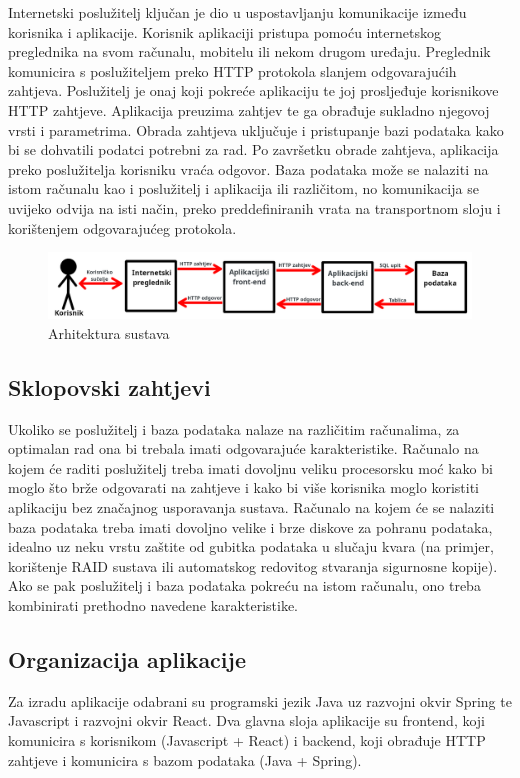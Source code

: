 				Internetski poslužitelj ključan je dio u uspostavljanju komunikacije između korisnika i aplikacije. Korisnik aplikaciji pristupa pomoću internetskog preglednika na svom računalu, mobitelu ili nekom drugom uređaju. Preglednik komunicira s poslužiteljem preko HTTP protokola slanjem odgovarajućih zahtjeva. Poslužitelj je onaj koji pokreće aplikaciju te joj prosljeđuje korisnikove HTTP zahtjeve.
				\linebreak
				Aplikacija preuzima zahtjev te ga obrađuje sukladno njegovoj vrsti i parametrima. Obrada zahtjeva uključuje i pristupanje bazi podataka kako bi se dohvatili podatci potrebni za rad. Po završetku obrade zahtjeva, aplikacija preko poslužitelja korisniku vraća odgovor.
				\linebreak
				Baza podataka može se nalaziti na istom računalu kao i poslužitelj i aplikacija ili različitom, no komunikacija se uvijeko odvija na isti način, preko preddefiniranih vrata na transportnom sloju i korištenjem odgovarajućeg protokola.
				\begin{figure}[H]
					\includegraphics[scale=0.85]{slike/skica_arhitekture.png}
					\centering
					\caption{Arhitektura sustava}
					\label{fig:arhitektura_sustava}
				\end{figure}
			\subsection{Sklopovski zahtjevi}
				Ukoliko se poslužitelj i baza podataka nalaze na različitim računalima, za optimalan rad ona bi trebala imati odgovarajuće karakteristike. Računalo na kojem će raditi poslužitelj treba imati dovoljnu veliku procesorsku moć kako bi moglo što brže odgovarati na zahtjeve i kako bi više korisnika moglo koristiti aplikaciju bez značajnog usporavanja sustava. Računalo na kojem će se nalaziti baza podataka treba imati dovoljno velike i brze diskove za pohranu podataka, idealno uz neku vrstu zaštite od gubitka podataka u slučaju kvara (na primjer, korištenje RAID sustava ili automatskog redovitog stvaranja sigurnosne kopije). Ako se pak poslužitelj i baza podataka pokreću na istom računalu, ono treba kombinirati prethodno navedene karakteristike.
			\subsection{Organizacija aplikacije}
				Za izradu aplikacije odabrani su programski jezik Java uz razvojni okvir Spring te Javascript i razvojni okvir React. Dva glavna sloja aplikacije su frontend, koji komunicira s korisnikom (Javascript + React) i backend, koji obrađuje HTTP zahtjeve i komunicira s bazom podataka (Java + Spring).
				
